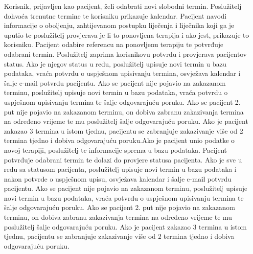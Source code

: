 				Korisnik, prijavljen kao pacijent, želi odabrati novi slobodni termin. Poslužitelj dohvaća trenutne termine te korisniku prikazuje kalendar. Pacijent navodi informacije o oboljenju, zahtijevanom postupku liječenja i liječnika koji ga je uputio te poslužitelj provjerava je li to ponovljena terapija i ako jest, prikazuje to korisniku. Pacijent odabire referencu na ponovljenu terapiju te potvrđuje odabrani termin. Poslužitelj zaprima korisnikovu potvrdu i provjerava pacijentov status. Ako je njegov status u redu, poslužitelj upisuje novi termin u bazu podataka, vraća potvrdu o uspješnom upisivanju termina, osvježava kalendar i šalje e-mail potvrdu pacijentu. Ako se pacijent nije pojavio na zakazanom terminu, poslužitelj upisuje novi termin u bazu podataka, vraća potvrdu o uspješnom upisivanju termina te šalje odgovarajuću poruku. Ako se pacijent 2. put nije pojavio na zakazanom terminu, on dobiva zabranu zakazivanja termina na određeno vrijeme te mu poslužitelj šalje odgovarajuću poruku. Ako je pacijent zakazao 3 termina u istom tjednu, pacijentu se zabranjuje zakazivanje više od 2 termina tjedno i dobiva odgovarajuću poruku.\newline Ako je pacijent unio podatke o novoj terapiji, poslužitelj te informacije sprema u bazu podataka. Pacijent potvrđuje odabrani termin te dolazi do provjere statusa pacijenta. Ako je sve u redu sa statusom pacijenta, poslužitelj upisuje novi termin u bazu podataka i nakon potvrde o uspješnom upisu, osvježava kalendar i šalje e-mail potvrdu pacijentu. Ako se pacijent nije pojavio na zakazanom terminu, poslužitelj upisuje novi termin u bazu podataka, vraća potvrdu o uspješnom upisivanju termina te šalje odgovarajuću poruku. Ako se pacijent 2. put nije pojavio na zakazanom terminu, on dobiva zabranu zakazivanja termina na određeno vrijeme te mu poslužitelj šalje odgovarajuću poruku. Ako je pacijent zakazao 3 termina u istom tjednu, pacijentu se zabranjuje zakazivanje više od 2 termina tjedno i dobiva odgovarajuću poruku.
				
